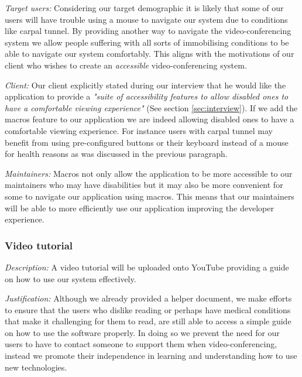 \textit{Target users:}
Considering our target demographic it is likely that
some of our users will have trouble using a mouse
to navigate our system due to conditions like carpal tunnel.
By providing another way to navigate the video-conferencing
system we allow people suffering with all sorts of
immobilising conditions to be able to navigate our system
comfortably. This aligns with the motivations of our client
who wishes to create an \textit{accessible} video-conferencing
system.
\\ \vspace{0.2cm}

\textit{Client:}
Our client explicitly stated during our interview
that he would like the application to provide a
\textit{"suite of accessibility features to allow
disabled ones to have a comfortable viewing
experience"} (See section \ref{sec:interview}). If we add
the macros feature to our application we are indeed allowing
disabled ones to have a comfortable viewing experience. For
instance users with carpal tunnel may benefit from using
pre-configured buttons or their keyboard instead of a mouse
for health reasons as was discussed in the previous paragraph.
\\ \vspace{0.2cm}

\textit{Maintainers:}
Macros not only allow the application to be more accessible
to our maintainers who may have disabilities but it may
also be more convenient for some to navigate our application
using macros. This means that our maintainers will be able
to more efficiently use our application improving the
developer experience.
\\ \vspace{0.2cm}

\subsubsection{Video tutorial}

\textit{Description:}
A video tutorial will be uploaded onto YouTube providing a
guide on how to use our system effectively. \\ \vspace{0.2cm}

\textit{Justification:}
Although we already provided a helper document, we make
efforts to ensure that the users who dislike reading or
perhaps have medical conditions that make it challenging for
them to read, are still able to access a simple guide on
how to use the software properly. In doing so we prevent the
need for our users to have to contact someone to support them
when video-conferencing, instead we promote their
independence in learning and understanding how to use new
technologies. \\ \vspace{0.2cm}

